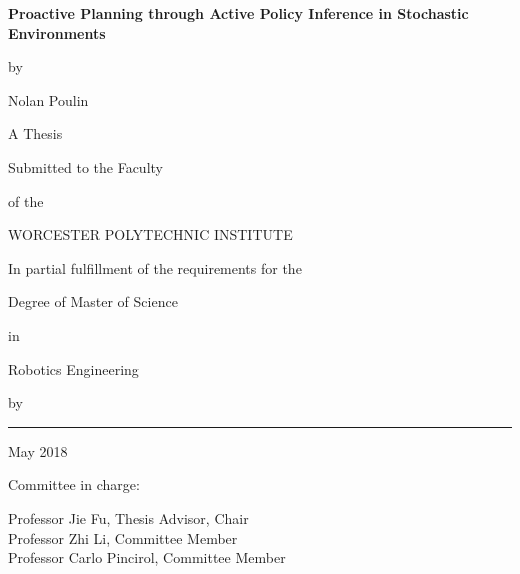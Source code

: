 \documentclass[12pt]{report}
\begin{document}
%




\thispagestyle{empty}

\begin{center}

\brk


   {\large
        \textbf{
        Proactive Planning through Active Policy Inference in Stochastic Environments
        }
   }


\brk
by

\brk
Nolan Poulin


\brk\brk
A Thesis

\brk
Submitted to the Faculty

\brk
of the

\brk
WORCESTER POLYTECHNIC INSTITUTE

\brk
In partial fulfillment of the requirements for the

\brk
Degree of Master of Science

\brk
in

\brk
Robotics Engineering

\brk
by

\brk\brk
\rule{3in}{1.2pt}

\brk
May 2018


\vfill
Committee in charge:

\vspace{0.5in}

Professor Jie Fu, Thesis Advisor, Chair \\
Professor Zhi Li, Committee Member \\
Professor Carlo Pincirol, Committee Member\\

\end{center}


\newpage
\end{document}
